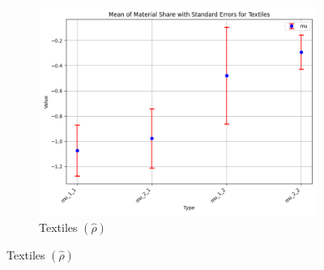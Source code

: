 \documentclass{article}
\begin{document}
\begin{figure}[ht!]
\begin{subfigure}[t]{0.32\textwidth}
        \centering
        \includegraphics[width=\textwidth]{figure/empirical_ar1_mixture_kmshare_ciiu_mu_with_error_bars_Textiles.png}
        \caption{Textiles $(\hat\rho)$}
    \end{subfigure}


\end{figure}
\end{document}
